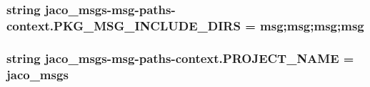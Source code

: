 \subsubsection[{\texorpdfstring{P\+K\+G\+\_\+\+M\+S\+G\+\_\+\+I\+N\+C\+L\+U\+D\+E\+\_\+\+D\+I\+RS}{PKG_MSG_INCLUDE_DIRS}}]{\setlength{\rightskip}{0pt plus 5cm}string jaco\+\_\+msgs-\/msg-\/paths-\/context.\+P\+K\+G\+\_\+\+M\+S\+G\+\_\+\+I\+N\+C\+L\+U\+D\+E\+\_\+\+D\+I\+RS = \textquotesingle{}msg;msg;msg;msg\textquotesingle{}}\hypertarget{namespacejaco__msgs-msg-paths-context_a615c13a91bdf0d70e95ff767b9bb1f66}{}\label{namespacejaco__msgs-msg-paths-context_a615c13a91bdf0d70e95ff767b9bb1f66}
\subsubsection[{\texorpdfstring{P\+R\+O\+J\+E\+C\+T\+\_\+\+N\+A\+ME}{PROJECT_NAME}}]{\setlength{\rightskip}{0pt plus 5cm}string jaco\+\_\+msgs-\/msg-\/paths-\/context.\+P\+R\+O\+J\+E\+C\+T\+\_\+\+N\+A\+ME = \textquotesingle{}jaco\+\_\+msgs\textquotesingle{}}\hypertarget{namespacejaco__msgs-msg-paths-context_a07c6ad829df8f3bb3913008e8a58a711}{}\label{namespacejaco__msgs-msg-paths-context_a07c6ad829df8f3bb3913008e8a58a711}
